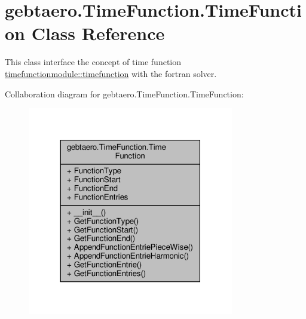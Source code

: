 \hypertarget{classgebtaero_1_1_time_function_1_1_time_function}{}\section{gebtaero.\+Time\+Function.\+Time\+Function Class Reference}
\label{classgebtaero_1_1_time_function_1_1_time_function}


This class interface the concept of time function \hyperlink{structtimefunctionmodule_1_1timefunction}{timefunctionmodule\+::timefunction} with the fortran solver.  




Collaboration diagram for gebtaero.\+Time\+Function.\+Time\+Function\+:\nopagebreak
\begin{figure}[H]
\begin{center}
\leavevmode
\includegraphics[width=255pt]{classgebtaero_1_1_time_function_1_1_time_function__coll__graph}
\end{center}
\end{figure}
